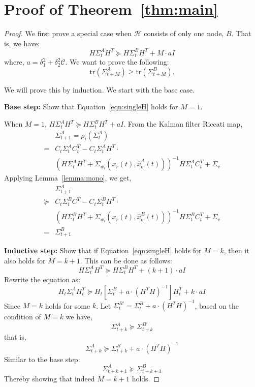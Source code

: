 \documentclass[journal]{IEEEtran}
\begin{document}
\section{Proof of Theorem~\ref{thm:main}}
\begin{proof}
We first prove a special case when $\mathcal{H}$ consists of only one node, $B$. That is, we have:
\begin{equation*}
H\Sigma_t^AH^T \succeq H\Sigma_t^BH^T+M\cdot aI
\end{equation*}
where, $a=\delta_1^2 +\delta_2^2\mathcal{C}$. We want to prove the following:
\begin{equation}
\text{tr}(\Sigma_{t+M}^A) \ge \text{tr}(\Sigma^B_{t+M}).
\label{eqn:singleH}
\end{equation}

We will prove this by induction. We start with the base case.

\noindent\textbf{Base step:} Show that Equation~\ref{eqn:singleH} holds for $M = 1$.

When $M = 1$, $H\Sigma^A_{t}H^T \succeq H\Sigma^B_tH^T+aI$. From the Kalman filter Riccati map,
\begin{equation}
\begin{split}
&\Sigma^A_{t+1}=\rho_i(\Sigma^A_{t})\\
=&C_t\Sigma^A_{t}C_t^T-C_t\Sigma^A_{t}H^T\cdot\\
&\left(H\Sigma^A_{t}H^T+\Sigma_{w_i}\left(x_r(t),\hat{x}^A_o(t)\right)\right)^{-1}H\Sigma^A_{t}C_t^T+\Sigma_v
\end{split}
\end{equation}
Applying Lemma~\ref{lemma:mono}, we get,
\begin{equation}
\begin{split}
&\Sigma^A_{t+1}\\
\succeq& C_t\Sigma^B_{t}C^T-C_t\Sigma^B_{t}H^T\cdot\\
&\left(H\Sigma^B_{t}H^T+\Sigma_{w_i}\left(x_r(t),\hat{x}^B_o(t)\right)\right)^{-1}H\Sigma^B_{t}C_t^T+\Sigma_v\\
=&\Sigma^B_{t+1}
\end{split}
\end{equation}

\noindent\textbf{Inductive step:} Show that if Equation~\ref{eqn:singleH} holds for $M=k$, then it also holds for $M=k+1$. This can be done as follows:
\begin{equation*}
H\Sigma_t^AH^T \succeq H\Sigma_t^BH^T+(k+1)\cdot aI
\end{equation*}
Rewrite the equation as:
\begin{equation*}
H_t\Sigma_t^AH_t^T \succeq H_t[\Sigma_t^B+a\cdot(H^TH)^{-1}]H_t^T+k\cdot aI
\end{equation*}
Since $M=k$ holds for some $k$. Let $\Sigma^{B'}_{t}=\Sigma^B_{t}+a\cdot (H^TH)^{-1}$, based on the condition of $M=k$ we have,
$$\Sigma^A_{t+k} \succeq \Sigma^{B'}_{t+k}$$
that is,
$$\Sigma^A_{t+k} \succeq \Sigma^B_{t+k}+a\cdot (H^TH)^{-1}$$
Similar to the base step:
$$\Sigma^A_{t+k+1} \succeq \Sigma^B_{t+k+1}$$
Thereby showing that indeed $M=k+1$ holds.


\end{proof}
\end{document}
